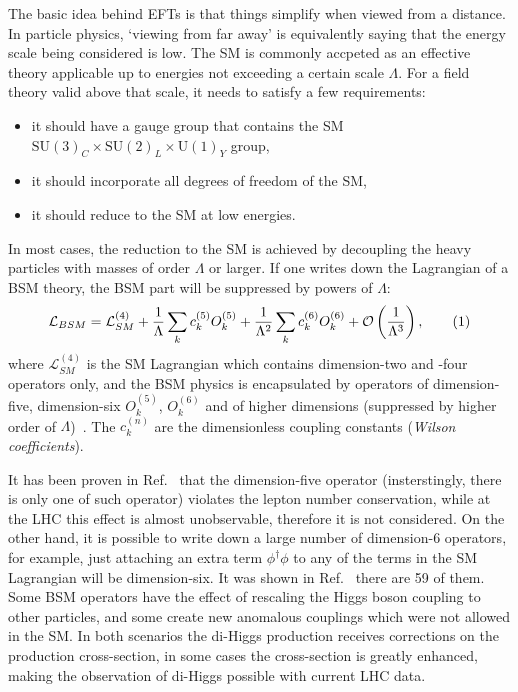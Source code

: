The basic idea behind EFTs is that things simplify when viewed from a distance.
In particle physics, `viewing from far away' is equivalently saying that the energy
scale being considered is low. 
The SM is commonly accpeted as an effective theory applicable 
up to energies not exceeding a certain scale $\Lambda$. 
For a field theory valid above that scale, it needs to satisfy a few requirements:
\begin{itemize}
    \item it should have a gauge group that contains the SM 
    $\text{SU}(3)_C \times \text{SU}(2)_L\times \text{U}(1)_Y$ group,
    \item it should incorporate all degrees of freedom of the SM,
    \item it should reduce to the SM at low energies.
\end{itemize}
In most cases, the reduction to the SM is achieved by 
decoupling the heavy particles with masses of order $\Lambda$ or larger. 
If one writes down the Lagrangian of a BSM theory, 
the BSM part will be suppressed by powers of $\Lambda$:
\[  
    \mathcal{L}_{BSM} = \mathcal{L}^{(4)}_{SM} + \frac{1}{\Lambda} \sum_k c^{(5)}_k O^{(5)}_k+
    \frac{1}{\Lambda^2} \sum_k c^{(6)}_k O^{(6)}_k + \mathcal{O} \left(\frac{1}{\Lambda^3}\right),
\addtag \]
where $\mathcal{L}^{(4)}_{SM}$ is the SM Lagrangian which contains dimension-two
and -four operators only, and the BSM physics is encapsulated by operators of 
dimension-five, dimension-six $O^{(5)}_k$, $O^{(6)}_k$ 
and of higher dimensions (suppressed by higher order of $\Lambda$)~\cite{EFT}.
The $c^{(n)}_k$ are the dimensionless coupling constants (\textit{Wilson coefficients}).

It has been proven in Ref.~\cite{EFT} that the dimension-five operator
(insterstingly, there is only one of such operator) violates 
the lepton number conservation, while at the LHC this effect is almost
unobservable, therefore it is not considered.
On the other hand, it is possible to write down a large number of dimension-6 operators, 
for example, just attaching an extra term $\phi^\dagger\phi$
to any of the terms in the SM Lagrangian will
be dimension-six. It was shown in Ref.~\cite{EFT-dimension-6} there are 59 of them.
Some BSM operators have the effect of rescaling the Higgs boson coupling to other 
particles, and some create new anomalous couplings which were not allowed in the SM. 
In both scenarios the di-Higgs production receives corrections on the production
cross-section, in some cases the cross-section is greatly enhanced, making 
the observation of di-Higgs possible with current LHC data.

